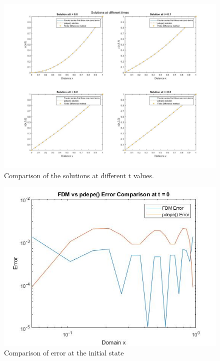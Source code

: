 \documentclass{article}
\begin{document}
\begin{figure}
	\begin{center}
		\includegraphics[width=\textwidth,height=\textheight,keepaspectratio]{MATLAB/C2.jpg}
	\end{center}
	\caption{Comparison of the solutions at different t values.}
\end{figure}
\begin{figure}
	\begin{center}
		\includegraphics[width=\textwidth,height=\textheight,keepaspectratio]{MATLAB/C3.jpg}
	\end{center}
	\caption{Comparison of error at the initial state}
\end{figure}
\newpage
\end{document}
